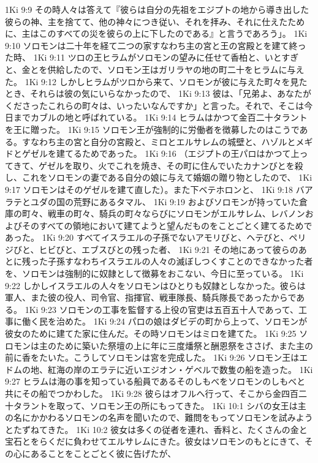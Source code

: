 1Ki 9:9  その時人々は答えて『彼らは自分の先祖をエジプトの地から導き出した彼らの神、主を捨てて、他の神々につき従い、それを拝み、それに仕えたために、主はこのすべての災を彼らの上に下したのである』と言うであろう」。
1Ki 9:10  ソロモンは二十年を経て二つの家すなわち主の宮と王の宮殿とを建て終った時、
1Ki 9:11  ツロの王ヒラムがソロモンの望みに任せて香柏と、いとすぎと、金とを供給したので、ソロモン王はガリラヤの地の町二十をヒラムに与えた。
1Ki 9:12  しかしヒラムがツロから来て、ソロモンが彼に与えた町々を見たとき、それらは彼の気にいらなかったので、
1Ki 9:13  彼は、「兄弟よ、あなたがくださったこれらの町々は、いったいなんですか」と言った。それで、そこは今日までカブルの地と呼ばれている。
1Ki 9:14  ヒラムはかつて金百二十タラントを王に贈った。
1Ki 9:15  ソロモン王が強制的に労働者を徴募したのはこうである。すなわち主の宮と自分の宮殿と、ミロとエルサレムの城壁と、ハゾルとメギドとゲゼルを建てるためであった。
1Ki 9:16  （エジプトの王パロはかつて上ってきて、ゲゼルを取り、火でこれを焼き、その町に住んでいたカナンびとを殺し、これをソロモンの妻である自分の娘に与えて婚姻の贈り物としたので、
1Ki 9:17  ソロモンはそのゲゼルを建て直した）。また下ベテホロンと、
1Ki 9:18  バアラテとユダの国の荒野にあるタマル、
1Ki 9:19  およびソロモンが持っていた倉庫の町々、戦車の町々、騎兵の町々ならびにソロモンがエルサレム、レバノンおよびそのすべての領地において建てようと望んだものをことごとく建てるためであった。
1Ki 9:20  すべてイスラエルの子孫でないアモリびと、ヘテびと、ペリジびと、ヒビびと、エブスびとの残った者、
1Ki 9:21  その地にあって彼らのあとに残った子孫すなわちイスラエルの人々の滅ぼしつくすことのできなかった者を、ソロモンは強制的に奴隷として徴募をおこない、今日に至っている。
1Ki 9:22  しかしイスラエルの人々をソロモンはひとりも奴隷としなかった。彼らは軍人、また彼の役人、司令官、指揮官、戦車隊長、騎兵隊長であったからである。
1Ki 9:23  ソロモンの工事を監督する上役の官吏は五百五十人であって、工事に働く民を治めた。
1Ki 9:24  パロの娘はダビデの町から上って、ソロモンが彼女のために建てた家に住んだ。その時ソロモンはミロを建てた。
1Ki 9:25  ソロモンは主のために築いた祭壇の上に年に三度燔祭と酬恩祭をささげ、また主の前に香をたいた。こうしてソロモンは宮を完成した。
1Ki 9:26  ソロモン王はエドムの地、紅海の岸のエラテに近いエジオン・ゲベルで数隻の船を造った。
1Ki 9:27  ヒラムは海の事を知っている船員であるそのしもべをソロモンのしもべと共にその船でつかわした。
1Ki 9:28  彼らはオフルへ行って、そこから金四百二十タラントを取って、ソロモン王の所にもってきた。
1Ki 10:1  シバの女王は主の名にかかわるソロモンの名声を聞いたので、難問をもってソロモンを試みようとたずねてきた。
1Ki 10:2  彼女は多くの従者を連れ、香料と、たくさんの金と宝石とをらくだに負わせてエルサレムにきた。彼女はソロモンのもとにきて、その心にあることをことごとく彼に告げたが、
